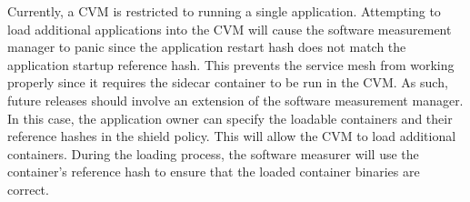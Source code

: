 Currently, a \acrshort{CVM} is restricted to running a single application. Attempting to load additional applications into the \acrshort{CVM}  will cause the software measurement manager to panic since the application restart hash does not match the application startup reference hash. 
This prevents the service mesh from working properly since it requires the sidecar container to be run in the \acrshort{CVM}. As such,  future releases should involve an extension of the software measurement manager. In this case, the application owner can specify the loadable containers and their 
reference hashes in the shield policy. This will allow the \acrshort{CVM} to load additional containers. During the loading process, the software measurer will use the container's reference hash to ensure that the loaded container binaries are correct.




\cleardoublepage

